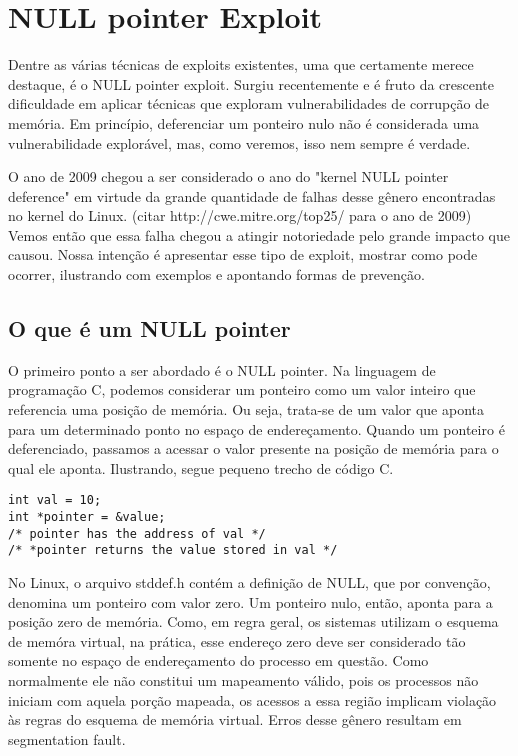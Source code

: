 
\chapter{NULL pointer Exploit}
\label{chap:null_pointer_exploit}

	Dentre as várias técnicas de exploits existentes, uma que certamente merece
	destaque, é o NULL pointer exploit.
	Surgiu recentemente e é fruto da crescente dificuldade em aplicar técnicas
	que exploram vulnerabilidades de corrupção de memória.
	Em princípio, deferenciar um ponteiro nulo não é considerada
	uma vulnerabilidade explorável, mas, como veremos, isso nem sempre é verdade.

	
	O ano de 2009 chegou a ser considerado o ano do "kernel NULL pointer deference"
	em virtude da grande quantidade de falhas desse gênero encontradas no kernel do Linux.
	(citar http://cwe.mitre.org/top25/ para o ano de 2009)
	Vemos então que essa falha chegou a atingir notoriedade pelo grande impacto que causou.
	Nossa intenção é apresentar esse tipo de exploit, mostrar como pode ocorrer, ilustrando
	com exemplos e apontando formas de prevenção.
	
	
	
	\section{O que é um NULL pointer}
		O primeiro ponto a ser abordado é o NULL pointer.
		Na linguagem de programação C, podemos considerar um ponteiro como um valor inteiro
		que referencia uma posição de memória. Ou seja, trata-se de um valor que aponta
		para um determinado ponto no espaço de endereçamento. Quando um ponteiro é deferenciado,
		passamos a acessar o valor presente na posição de memória para o qual ele aponta.
		Ilustrando, segue pequeno trecho de código C.
		\begin{lstlisting}[label=pointer_example,caption=Ponteiro em C]
int val = 10;
int *pointer = &value;
/* pointer has the address of val */
/* *pointer returns the value stored in val */
		\end{lstlisting}
		

		No Linux, o arquivo stddef.h contém a definição de NULL, que por
		convenção, denomina um ponteiro com valor zero.
		Um ponteiro nulo, então, aponta para a posição zero de memória. 
		Como, em regra geral, os sistemas utilizam o esquema de memóra virtual,
		na prática, esse endereço zero deve ser considerado tão somente no espaço
		de endereçamento do processo em questão.
		Como normalmente ele não constitui um mapeamento válido, pois os processos não
		iniciam com aquela porção mapeada, os acessos a essa região implicam violação
		às regras do esquema de memória virtual. Erros desse gênero resultam em
		segmentation fault.   

